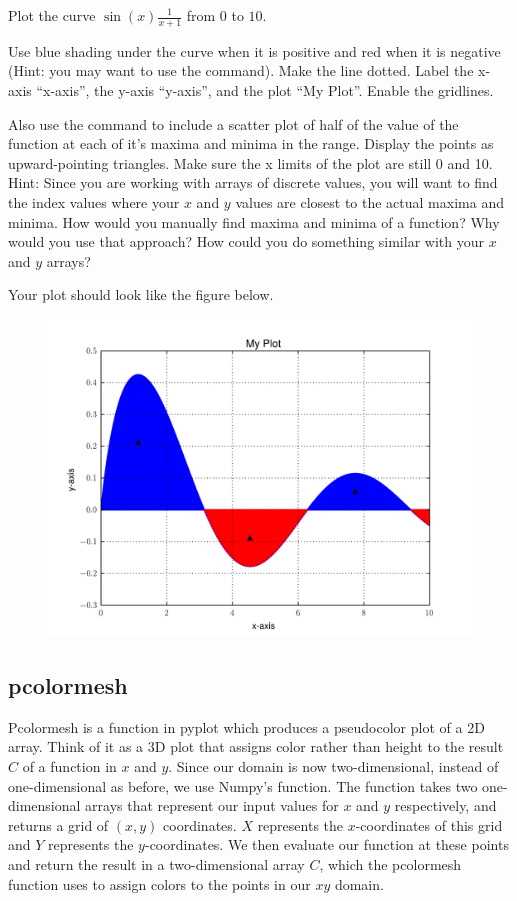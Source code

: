 \begin{problem} Plot the curve $\sin(x)\frac{1}{x+1}$ from $0$ to $10$.

Use blue shading under the curve when it is positive and red when it is
negative (Hint: you may want to use the  command).
Make the line dotted. Label the x-axis ``x-axis'', the y-axis ``y-axis'',
and the plot ``My Plot''. Enable the gridlines.


Also use the  command to include a scatter plot of half of the value of the function at each
of it's maxima and minima in the range. Display the points as
upward-pointing triangles. Make sure the x limits of the plot are still 0 and 10.
Hint: Since you are working with arrays of discrete values, you will want to find the index values where your $x$ and $y$ values are closest to the actual maxima and minima. How would you manually find maxima and minima of a function? Why would you use that approach? How could you do something similar with your $x$ and $y$ arrays?

Your plot should look like the figure below.

\begin{figure}[H]
\includegraphics[width=\textwidth]{soln3.pdf}
\label{fig:problem3} 
\end{figure}
\end{problem}

\subsection*{pcolormesh}
Pcolormesh is a function in pyplot which produces a pseudocolor plot of a 2D array. Think of it as a 3D plot that assigns color rather than height to the result $C$ of a function in $x$ and $y$. Since our domain is now two-dimensional, instead of one-dimensional as before, we use Numpy's  function. The  function takes two one-dimensional arrays that represent our input values for $x$ and $y$ respectively, and returns a grid of $(x, y)$ coordinates. $X$ represents the $x$-coordinates of this grid and $Y$ represents the $y$-coordinates. We then evaluate our function at these points and return the result in a two-dimensional array $C$, which the pcolormesh function uses to assign colors to the points in our $xy$ domain.

